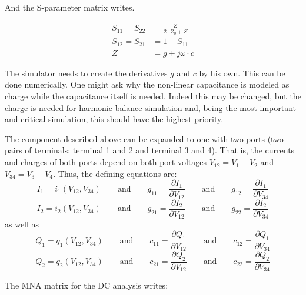 And the S-parameter matrix writes.

\begin{align}
S_{11} = S_{22} &= \frac{Z}{2\cdot Z_0+Z} \\
S_{12} = S_{21} &= 1-S_{11} \\
Z &= g + j\omega\cdot c
\end{align}

The simulator needs to create the derivatives $g$ and $c$ by his
own. This can be done numerically. One might ask why the non-linear
capacitance is modeled as charge while the capacitance itself is
needed. Indeed this may be changed, but the charge is needed for
harmonic balance simulation and, being the most important and critical
simulation, this should have the highest priority.

\addvspace{12pt}

The component described above can be expanded to one with two ports
(two pairs of terminals: terminal 1 and 2 and terminal 3 and 4).
That is, the currents and charges of both ports depend on both
port voltages $V_{12}=V_1-V_2$ and $V_{34}=V_3-V_4$. Thus, the defining equations are:
\begin{equation}
I_1 = i_1(V_{12}, V_{34}) \qquad\text{and}\qquad
g_{11} = \dfrac{\partial I_1}{\partial V_{12}} \qquad\text{and}\qquad
g_{12} = \dfrac{\partial I_1}{\partial V_{34}}
\end{equation}
\begin{equation}
I_2 = i_2(V_{12}, V_{34}) \qquad\text{and}\qquad
g_{21} = \dfrac{\partial I_2}{\partial V_{12}} \qquad\text{and}\qquad
g_{22} = \dfrac{\partial I_2}{\partial V_{34}}
\end{equation}
as well as
\begin{equation}
Q_1 = q_1(V_{12}, V_{34}) \qquad\text{and}\qquad
c_{11} = \dfrac{\partial Q_1}{\partial V_{12}} \qquad\text{and}\qquad
c_{12} = \dfrac{\partial Q_1}{\partial V_{34}}
\end{equation}
\begin{equation}
Q_2 = q_2(V_{12}, V_{34}) \qquad\text{and}\qquad
c_{21} = \dfrac{\partial Q_2}{\partial V_{12}} \qquad\text{and}\qquad
c_{22} = \dfrac{\partial Q_2}{\partial V_{34}}
\end{equation}

The MNA matrix for the DC analysis writes:

